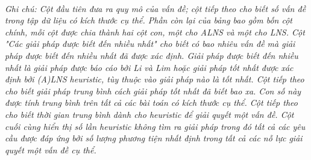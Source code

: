 \begin{table}[caption={Summary of Results Obtained on Li and Lim Instances (2001)}, label=tab:2]
     \\
        \justify
        \textit{Ghi chú: Cột đầu tiên đưa ra quy mô của vấn đề; cột tiếp theo cho biết số vấn đề trong tập dữ liệu có kích thước cụ thể. Phần còn lại của bảng bao gồm bốn cột chính, mỗi cột được chia thành hai cột con, một cho ALNS và một cho LNS. Cột "Các giải pháp được biết đến nhiều nhất" cho biết có bao nhiêu vấn đề mà giải pháp được biết đến nhiều nhất đã được xác định. Giải pháp được biết đến nhiều nhất là giải pháp được báo cáo bởi Li và Lim hoặc giải pháp tốt nhất được xác định bởi (A)LNS heuristic, tùy thuộc vào giải pháp nào là tốt nhất. Cột tiếp theo cho biết giải pháp trung bình cách giải pháp tốt nhất đã biết bao xa. Con số này được tính trung bình trên tất cả các bài toán có kích thước cụ thể. Cột tiếp theo cho biết thời gian trung bình dành cho heuristic để giải quyết một vấn đề. Cột cuối cùng hiển thị số lần heuristic không tìm ra giải pháp trong đó tất cả các yêu cầu được đáp ứng bởi số lượng phương tiện nhất định trong tất cả các nỗ lực giải quyết một vấn đề cụ thể.}
\end{table}

